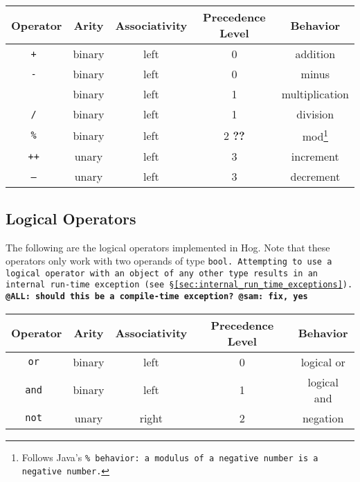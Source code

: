 \documentclass{book}
\begin{document}
\begin{center}
\begin{tabular}{|c|c|c|c|c|}

\hline \textbf{Operator} & \textbf{Arity} & \textbf{Associativity} &
\textbf{Precedence Level} & \textbf{Behavior} \\ \hline
\tt + \rm & binary & left & 0 & addition \\ \hline
\tt - \rm & binary & left & 0 & minus \\ \hline
\tt * \rm & binary & left & 1 & multiplication \\ \hline
\tt / \rm & binary & left & 1 & division \\ \hline
\tt \% \rm & binary & left & 2 \textbf{??} & mod\footnote{Follows Java's 
\tt \% \rm behavior: a modulus of a negative number is a negative number.} \\ 
\hline
\tt ++ \rm & unary & left & 3 & increment \\ \hline
\tt -- \rm & unary & left & 3 & decrement \\ \hline
\end{tabular}
\end{center}


\subsection{Logical Operators} %
\label{sub:logical_operators}

The following are the logical operators implemented in Hog. Note that these
operators only work with two operands of type \tt bool\rm. Attempting to use a
logical operator with an object of any other type results in an internal run-time
exception (see \S \ref{sec:internal_run_time_exceptions}). \textbf{@ALL: should
this be a compile-time exception?} \textbf{@sam: fix, yes}

\begin{center}
\begin{tabular}{|c|c|c|c|c|}

\hline \textbf{Operator} & \textbf{Arity} & \textbf{Associativity} &
\textbf{Precedence Level} & \textbf{Behavior} \\ \hline
\tt or \rm & binary & left & 0 & logical or \\ \hline
\tt and \rm & binary & left & 1 & logical and \\ \hline
\tt not \rm & unary & right & 2 & negation \\ \hline
\end{tabular}
\end{center}
\end{document}
